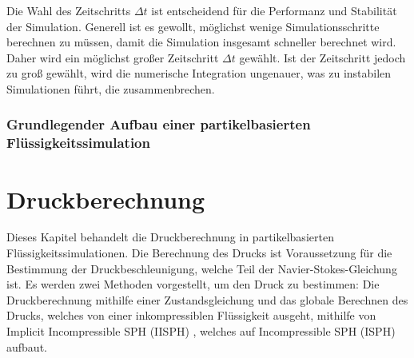 \documentclass{scrreprt}
\begin{document}
Die Wahl des Zeitschritts $\Delta t$ ist entscheidend für die Performanz und Stabilität der Simulation.
Generell ist es gewollt, möglichst wenige Simulationsschritte berechnen zu müssen, damit die Simulation insgesamt schneller berechnet wird.
Daher wird ein möglichst großer Zeitschritt $\Delta t$ gewählt.
Ist der Zeitschritt jedoch zu groß gewählt, wird die numerische Integration ungenauer, was zu instabilen Simulationen führt, die zusammenbrechen.


\subsection{Grundlegender Aufbau einer partikelbasierten Flüssigkeitssimulation}


\chapter{Druckberechnung}
Dieses Kapitel behandelt die Druckberechnung in partikelbasierten Flüssigkeitssimulationen.
Die Berechnung des Drucks ist Voraussetzung für die Bestimmung der Druckbeschleunigung, welche Teil der Navier-Stokes-Gleichung ist.
Es werden zwei Methoden vorgestellt, um den Druck zu bestimmen:
Die Druckberechnung mithilfe einer Zustandsgleichung und das globale Berechnen des Drucks, welches von einer inkompressiblen Flüssigkeit ausgeht,
mithilfe von Implicit Incompressible SPH (IISPH) \cite{ihmsen_implicit_2014}, 
welches auf Incompressible SPH (ISPH) \cite{shao_incompressible_2003} aufbaut.
\end{document}
